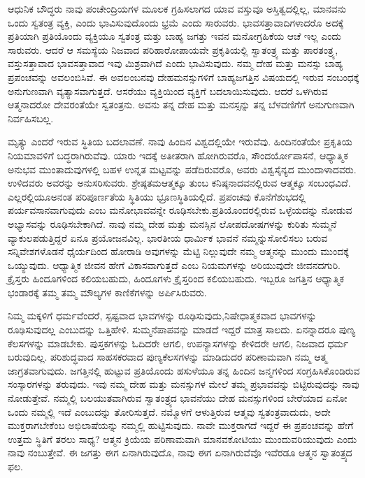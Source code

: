 ಆಧುನಿಕ ಬೌದ್ಧರು ನಾವು ಪಂಚೇಂದ್ರಿಯಗಳ ಮೂಲಕ ಗ್ರಹಿಸಲಾಗದ ಯಾವ ವಸ್ತುವೂ ಅಸ್ತಿತ್ವದಲ್ಲಿಲ್ಲ, ಮಾನವನು ಒಂದು ಸ್ವತಂತ್ರ ವ್ಯಕ್ತಿ, ಎಂದು ಭಾವಿಸುವುದೊಂದು ಭ್ರಮೆ ಎಂದು ಸಾರುವರು. ಭಾವಸತ್ತಾವಾದಿಗಳಾದರೊ  ಅದಕ್ಕೆ ಪ್ರತಿಯಾಗಿ ಪ್ರತಿಯೊಂದು ವ್ಯಕ್ತಿಯೂ ಸ್ವತಂತ್ರ ಮತ್ತು ಬಾಹ್ಯ ಜಗತ್ತು ಇವನ ಮನೋಗ್ರಹಿಕೆಯ ಆಚೆ ಇಲ್ಲ ಎಂದು ಸಾರುವರು. ಆದರೆ ಆ ಸಮಸ್ಯೆಯ ನಿಜವಾದ ಪರಿಹಾರೋಪಾಯವೇ ಪ್ರಕೃತಿಯಲ್ಲಿ ಸ್ವಾತಂತ್ರ್ಯ ಮತ್ತು ಪಾರತಂತ್ರ್ಯ, ವಸ್ತುಸತ್ತಾವಾದ ಭಾವಸತ್ತಾವಾದ ಇವು ಮಿಶ್ರವಾಗಿದೆ ಎಂದು ಭಾವಿಸುವುದು. ನಮ್ಮ ದೇಹ ಮತ್ತು ಮನಸ್ಸು ಬಾಹ್ಯ ಪ್ರಪಂಚವನ್ನು ಅವಲಂಬಿಸಿವೆ. ಈ ಅವಲಂಬನವು ದೇಹಮನಸ್ಸುಗಳಿಗೆ ಬಾಹ್ಯಜಗತ್ತಿನ ವಿಷಯದಲ್ಲಿ ಇರುವ ಸಂಬಂಧಕ್ಕೆ ಅನುಗುಣವಾಗಿ ವ್ಯತ್ಯಾಸವಾಗುತ್ತದೆ. ಆಸರೆಯು ವ್ಯಕ್ತಿಯಿಂದ ವ್ಯಕ್ತಿಗೆ ಬದಲಾಯಿಸುವುದು. ಆದರೆ ಒಳಗಿರುವ ಆತ್ಮನಾದರೋ ದೇವರಂತೆಯೇ ಸ್ವತಂತ್ರನು. ಅವನು ತನ್ನ ದೇಹ ಮತ್ತು ಮನಸ್ಸನ್ನು ತನ್ನ ಬೆಳವಣಿಗೆಗೆ ಅನುಗುಣವಾಗಿ ನಿರ್ವಹಿಸಬಲ್ಲ.

ಮೃತ್ಯು ಎಂದರೆ ಇರುವ ಸ್ಥಿತಿಯ ಬದಲಾವಣೆ. ನಾವು ಹಿಂದಿನ ವಿಶ್ವದಲ್ಲಿಯೇ ಇರುವೆವು. ಹಿಂದಿನಂತೆಯೇ ಪ್ರಕೃತಿಯ ನಿಯಮಾವಳಿಗೆ ಬದ್ಧರಾಗಿರುವೆವು. ಯಾರು ಇದಕ್ಕೆ ಅತೀತರಾಗಿ ಹೋಗಿರುವರೊ, ಸೌಂದರ್ಯೋಪಾಸನೆ, ಆಧ್ಯಾತ್ಮಿಕ ಅನುಭವ ಮುಂತಾದುವುಗಳಲ್ಲಿ ಬಹಳ ಉನ್ನತ ಮಟ್ಟವನ್ನು ಪಡೆದಿರುವರೊ, ಅವರು ವಿಶ್ವ\break ಸೈನ್ಯದ ಮುಂದಾಳಾದವರು. ಉಳಿದವರು ಅವರನ್ನು ಅನುಸರಿಸುವರು. ಶ್ರೇಷ್ಠತಮ\break ಆತ್ಮಕ್ಕೂ ತುಂಬ ಕನಿಷ್ಠನಾದವನಲ್ಲಿರುವ ಆತ್ಮಕ್ಕೂ ಸಂಬಂಧವಿದೆ. ಎಲ್ಲರಲ್ಲಿಯೂ\break ಅನಂತ ಪರಿಪೂರ್ಣತೆಯ ಸ್ಥಿತಿಯು ಭ್ರೂಣಸ್ಥಿತಿಯಲ್ಲಿದೆ. ಪ್ರಪಂಚವು ಕೊನೆಗೆ\break ಶುಭದಲ್ಲಿ ಪರ್ಯವಸಾನವಾಗುವುದು ಎಂಬ ಮನೋಭಾವವನ್ನೇ ರೂಢಿಸಬೇಕು.\break ಪ್ರತಿಯೊಂದರಲ್ಲಿರುವ ಒಳ್ಳೆಯದನ್ನು ನೋಡುವ ಅಭ್ಯಾಸವನ್ನು ರೂಢಿಸಬೇಕಾಗಿದೆ. ನಾವು ನಮ್ಮ ದೇಹ ಮತ್ತು ಮನಸ್ಸಿನ ಲೋಪದೋಷಗಳನ್ನು ಕುರಿತು ಸುಮ್ಮನೆ ವ್ಯಾಕುಲಪಡುತ್ತಿದ್ದರೆ ಏನೂ ಪ್ರಯೋಜನವಿಲ್ಲ. ಭಾರತೀಯ ಧಾರ್ಮಿಕ ಭಾವನೆ
 ನಮ್ಮನ್ನು\break ಸೋಲಿಸಲು ಬರುವ ಸನ್ನಿವೇಶಗಳೊಡನೆ ಧೈರ್ಯದಿಂದ ಹೋರಾಡಿ ಅವುಗಳನ್ನು ಮೆಟ್ಟಿ ನಿಲ್ಲುವುದೇ ನಮ್ಮ ಆತ್ಮನನ್ನು ಮುಂದು ಮುಂದಕ್ಕೆ ಒಯ್ಯುವುದು. ಆಧ್ಯಾತ್ಮಿಕ ಜೀವನ ಹೇಗೆ ವಿಕಾಸವಾಗುತ್ತದೆ ಎಂಬ ನಿಯಮಗಳನ್ನು ಅರಿಯುವುದೇ ಜೀವನದಗುರಿ. ಕ್ರೈಸ್ತರು ಹಿಂದೂಗಳಿಂದ ಕಲಿಯಬಹುದು, ಹಿಂದೂಗಳು ಕ್ರೈಸ್ತರಿಂದ ಕಲಿಯಬಹುದು. ಇಬ್ಬರೂ ಜಗತ್ತಿನ ಆಧ್ಯಾತ್ಮಿಕ ಭಂಡಾರಕ್ಕೆ ತಮ್ಮ ತಮ್ಮ ಮೌಲ್ಯಗಳ ಕಾಣಿಕೆಗಳನ್ನು ಅರ್ಪಿಸಿರುವರು.

ನಿಮ್ಮ ಮಕ್ಕಳಿಗೆ ಧರ್ಮವೆಂದರೆ, ಸ್ಪಷ್ಟವಾದ ಭಾವಗಳನ್ನು ರೂಢಿಸುವುದು,\break ನಿಷೇಧಾತ್ಮಕವಾದ ಭಾವಗಳನ್ನು ರೂಢಿಸುವುದಲ್ಲ ಎಂಬುದನ್ನು ಒತ್ತಿಹೇಳಿ. ಸುಮ್ಮನೆ\break ಪಾಪವನ್ನು ಮಾಡದೆ ಇದ್ದರೆ ಮಾತ್ರ ಸಾಲದು. ಏನನ್ನಾದರೂ ಪುಣ್ಯ ಕೆಲಸಗಳನ್ನು ಮಾಡಬೇಕು. ಪುಸ್ತಕಗಳನ್ನು ಓದಿದರೇ ಆಗಲಿ, ಉಪನ್ಯಾಸಗಳನ್ನು ಕೇಳಿದರೇ ಆಗಲಿ, ನಿಜವಾದ ಧರ್ಮ ಬರುವುದಿಲ್ಲ. ಪರಿಶುದ್ಧವಾದ ಸಾಹಸಕರವಾದ ಪುಣ್ಯಕೆಲಸಗಳನ್ನು ಮಾಡಿದುದರ ಪರಿಣಾಮವಾಗಿ ನಮ್ಮ ಆತ್ಮ ಜಾಗ್ರತವಾಗುವುದು. ಜಗತ್ತಿನಲ್ಲಿ ಹುಟ್ಟುವ ಪ್ರತಿಯೊಂದು ಹಸುಳೆಯೂ ತನ್ನ ಹಿಂದಿನ ಜನ್ಮಗಳಿಂದ ಸಂಗ್ರಹಿಸಿಕೊಂಡಿರುವ ಸಂಸ್ಕಾರಗಳನ್ನು ತರುವುದು. ಇವು ನಮ್ಮ ದೇಹ ಮತ್ತು ಮನಸ್ಸುಗಳ ಮೇಲೆ ತಮ್ಮ ಪ್ರಭಾವವನ್ನು ಬಿಟ್ಟಿರುವುದನ್ನು ನಾವು ನೋಡುತ್ತೇವೆ. ನಮ್ಮಲ್ಲಿ ಬಲಯುತವಾಗಿರುವ ಸ್ವಾತಂತ್ರ್ಯದ ಭಾವನೆಯು ದೇಹ ಮನಸ್ಸುಗಳಿಂದ ಬೇರೆಯಾದ ಏನೋ ಒಂದು ನಮ್ಮಲ್ಲಿ ಇದೆ ಎಂಬುದನ್ನು ತೋರಿಸುತ್ತದೆ. ನಮ್ಮೊಳಗೆ ಆಳುತ್ತಿರುವ ಆತ್ಮವು ಸ್ವತಂತ್ರವಾದುದು, ಅದೇ ಮುಕ್ತರಾಗಬೇಕೆಂಬ ಅಭಿಲಾಷೆಯನ್ನು ನಮ್ಮಲ್ಲಿ ಹುಟ್ಟಿಸುವುದು. ನಾವೇ ಮುಕ್ತರಾಗದೆ ಇದ್ದರೆ ಈ ಪ್ರಪಂಚವನ್ನು ಹೇಗೆ ಉತ್ತಮ ಸ್ಥಿತಿಗೆ ತರಲು ಸಾಧ್ಯ? ಆತ್ಮನ ಕ್ರಿಯೆಯ ಪರಿಣಾಮವಾಗಿ ಮಾನವಕೋಟಿಯು ಮುಂದುವರಿಯುವುದು ಎಂದು ನಾವು ನಂಬುತ್ತೇವೆ. ಈ ಜಗತ್ತು ಈಗ ಏನಾಗಿರುವುದೊ, ನಾವು ಈಗ ಏನಾಗಿರುವೆವೊ ಇವೆರಡೂ ಆತ್ಮನ ಸ್ವಾತಂತ್ರ್ಯದ ಫಲ.

